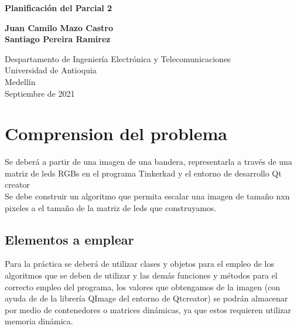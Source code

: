 \documentclass{article}
\begin{document}
\begin{titlepage}
    \begin{center}
        \vspace*{1cm}
            
        \Huge
        \textbf{Planificación del Parcial 2}
            
        \vspace{0.5cm}
        \LARGE
            
        \vspace{1.5cm}
            
        \textbf{Juan Camilo Mazo Castro}\\
        \textbf{Santiago Pereira Ramirez}
            
        \vfill
            
        \vspace{0.8cm}
            
        \Large
        Despartamento de Ingeniería Electrónica y Telecomunicaciones\\
        Universidad de Antioquia\\
        Medellín\\
        Septiembre de 2021
            
    \end{center}
\end{titlepage}

\tableofcontents
\newpage
\section{Comprension del problema}\label{intro}
Se deberá a partir de una imagen de una bandera, representarla a través de una matriz de leds RGBs en el programa Tinkerkad y el entorno de desarrollo Qt creator\\

Se debe construir un algoritmo que permita escalar una imagen de tamaño nxn pixeles a el tamaño de la matriz de leds que construyamos.\\

\subsection{Elementos a emplear} \label{contenido}
Para la práctica se deberá de utilizar clases y objetos para el empleo de los algoritmos que se deben de utilizar y las demás funciones y métodos para el correcto empleo del programa, los valores que obtengamos de la imagen (con ayuda de de la librería QImage del entorno de Qtcreator) se podrán almacenar por medio de contenedores o matrices dinámicas, ya que estos requieren utilizar memoria dinámica.\\
\end{document}
